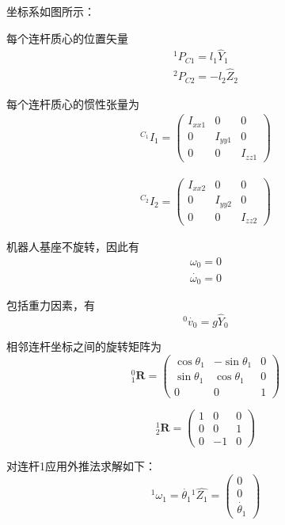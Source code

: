\documentclass{homework}
\begin{document}
\begin{sol}

坐标系如图所示：


每个连杆质心的位置矢量
\begin{align*}
  {^1}P_{C1} = l_1 \hat{Y}_1 \\
  {^2}P_{C2} = -l_2 \hat{Z}_2
\end{align*}

每个连杆质心的惯性张量为
\begin{align*}
  {^{C_1}}I_1 =
  \begin{pmatrix}
    I_{xx1} & 0 & 0 \\
    0 & I_{yy1} & 0 \\
    0 & 0 & I_{zz1}
  \end{pmatrix}
\end{align*}

\begin{align*}
  {^{C_2}}I_2 =
  \begin{pmatrix}
    I_{xx2} & 0 & 0 \\
    0 & I_{yy2} & 0 \\
    0 & 0 & I_{zz2}
  \end{pmatrix}
\end{align*}
  
机器人基座不旋转，因此有
\begin{align*}
  \omega_0 = 0 \\
  \dot{\omega_0} = 0
\end{align*}

包括重力因素，有
\[
  {^0}\dot{v_0} = g \hat{Y}_0
\]

相邻连杆坐标之间的旋转矩阵为
\[
  _1^0\mathbf{R} =
  \begin{pmatrix}
    \cos\theta_1 & -\sin\theta_1 & 0 \\
    \sin\theta_1 & \cos\theta_1 & 0 \\
    0 & 0 & 1
  \end{pmatrix}
\]

\[
  _2^1\mathbf{R} =
  \begin{pmatrix}
    1 & 0 & 0 \\
    0 & 0 & 1 \\
    0 & -1 & 0
  \end{pmatrix}
\]

对连杆1应用外推法求解如下：
\[
  {^1}\omega_1 = \dot{\theta_1} {^1}\hat{Z_1} = 
  \begin{pmatrix}
    0 \\
    0 \\
    \dot{\theta_1} 
  \end{pmatrix}
\]


\end{sol}
\end{document}
